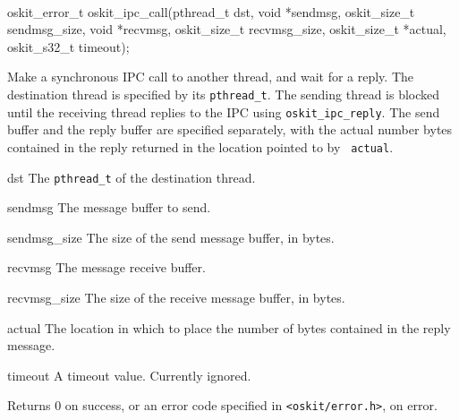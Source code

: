 \begin{apisyn}
	\\

	\funcproto oskit_error_t
	oskit_ipc_call(pthread_t dst,
		       void *sendmsg, oskit_size_t sendmsg_size,
		       void *recvmsg, oskit_size_t recvmsg_size,
		       oskit_size_t *actual, oskit_s32_t timeout);
\end{apisyn}
\begin{apidesc}
	Make a synchronous IPC call to another thread, and wait for a
	reply. The destination thread is specified by its {\tt pthread_t}.
	The sending thread is blocked until the receiving thread replies to
	the IPC using {\tt oskit_ipc_reply}. The send buffer and the reply
	buffer are specified separately, with the actual number bytes
	contained in the reply returned in the location pointed to by {\tt
	actual}.
\end{apidesc}
\begin{apiparm}
	\item[dst]
		The {\tt pthread_t} of the destination thread.
	\item[sendmsg]
		The message buffer to send. 
	\item[sendmsg_size]
		The size of the send message buffer, in bytes.
	\item[recvmsg]
		The message receive buffer.
	\item[recvmsg_size]
		The size of the receive message buffer, in bytes.
	\item[actual]
		The location in which to place the number of bytes
		contained in the reply message.
	\item[timeout]
		A timeout value. Currently ignored.
\end{apiparm}
\begin{apiret}
	Returns 0 on success, or an error code specified in
	{\tt <oskit/error.h>}, on error.
\end{apiret}


